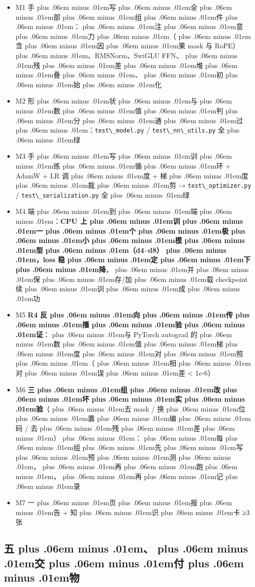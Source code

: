 \documentclass[
]{article}
\newcommand{\passthrough}[1]{#1}
\providecommand{\tightlist}{%
  \setlength{\itemsep}{0pt}\setlength{\parskip}{0pt}}
\def\zh#1{{\zhfont #1}}
\def\sym#1{{\symfont #1}}
\def\zhglue{\hskip0pt plus .06em minus .01em}
\begin{document}
\begin{itemize}
\tightlist
\item[$\square$]
  M1 \zh{手\zhglue 写\zhglue 全\zhglue 部\zhglue 组\zhglue 件\zhglue ：\zhglue 注\zhglue 意\zhglue 力\zhglue （\zhglue 含\zhglue 因\zhglue 果} mask \zh{与} RoPE\zh{）\zhglue 、}RMSNorm\zh{、}SwiGLU FFN\zh{、\zhglue 残\zhglue 差\zhglue 堆\zhglue 叠\zhglue 、\zhglue 初\zhglue 始\zhglue 化}
\item[$\square$]
  M2 \zh{形\zhglue 状\zhglue 与\zhglue 数\zhglue 值\zhglue 判\zhglue 分\zhglue 通\zhglue 过\zhglue ：}\passthrough{\lstinline!test\_model.py!} / \passthrough{\lstinline!test\_nn\_utils.py!} \zh{全\zhglue 绿}
\item[$\square$]
  M3 \zh{手\zhglue 写\zhglue 训\zhglue 练\zhglue 循\zhglue 环} + AdamW + LR \zh{调\zhglue 度} + \zh{梯\zhglue 度\zhglue 裁\zhglue 剪} \sym{→} \passthrough{\lstinline!test\_optimizer.py!} / \passthrough{\lstinline!test\_serialization.py!} \zh{全\zhglue 绿}
\item[$\square$]
  M4 \zh{端\zhglue 到\zhglue 端\zhglue ：}\textbf{CPU \zh{上\zhglue 训\zhglue 一\zhglue 个\zhglue 极\zhglue 小\zhglue 模\zhglue 型\zhglue （}d4--d8\zh{）\zhglue ，}loss \zh{稳\zhglue 定\zhglue 下\zhglue 降}}\zh{，\zhglue 并\zhglue 保\zhglue 存}/\zh{加\zhglue 载} checkpoint \zh{续\zhglue 训\zhglue 成\zhglue 功}
\item[$\square$]
  M5 \textbf{R4 \zh{反\zhglue 向\zhglue 传\zhglue 播\zhglue 验\zhglue 证}}\zh{：\zhglue 与} PyTorch autograd \zh{的\zhglue 数\zhglue 值\zhglue 梯\zhglue 度\zhglue 对\zhglue 照\zhglue （\zhglue 相\zhglue 对\zhglue 误\zhglue 差} \textless{} 1e-6\zh{）}
\item[$\square$]
  M6 \textbf{\zh{三\zhglue 组\zhglue 改\zhglue 坏\zhglue 实\zhglue 验}}\zh{（\zhglue 去} mask / \zh{换\zhglue 位\zhglue 置\zhglue 编\zhglue 码} / \zh{去\zhglue 残\zhglue 差\zhglue ）\zhglue ：\zhglue 每\zhglue 组\zhglue 先\zhglue 写\zhglue 预\zhglue 测\zhglue ，\zhglue 再\zhglue 跑\zhglue ，\zhglue 再\zhglue 记\zhglue 录}
\item[$\square$]
  M7 \zh{一\zhglue 页\zhglue 报\zhglue 告} + \zh{知\zhglue 识\zhglue 卡} \sym{≥}3 \zh{张}
\end{itemize}

\subsection{\zh{五\zhglue 、\zhglue 交\zhglue 付\zhglue 物}}\label{ux4e94ux4ea4ux4ed8ux7269}
\end{document}
